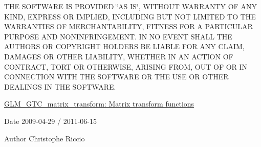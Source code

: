 \-T\-H\-E \-S\-O\-F\-T\-W\-A\-R\-E \-I\-S \-P\-R\-O\-V\-I\-D\-E\-D \char`\"{}\-A\-S I\-S\char`\"{}, \-W\-I\-T\-H\-O\-U\-T \-W\-A\-R\-R\-A\-N\-T\-Y \-O\-F \-A\-N\-Y \-K\-I\-N\-D, \-E\-X\-P\-R\-E\-S\-S \-O\-R \-I\-M\-P\-L\-I\-E\-D, \-I\-N\-C\-L\-U\-D\-I\-N\-G \-B\-U\-T \-N\-O\-T \-L\-I\-M\-I\-T\-E\-D \-T\-O \-T\-H\-E \-W\-A\-R\-R\-A\-N\-T\-I\-E\-S \-O\-F \-M\-E\-R\-C\-H\-A\-N\-T\-A\-B\-I\-L\-I\-T\-Y, \-F\-I\-T\-N\-E\-S\-S \-F\-O\-R \-A \-P\-A\-R\-T\-I\-C\-U\-L\-A\-R \-P\-U\-R\-P\-O\-S\-E \-A\-N\-D \-N\-O\-N\-I\-N\-F\-R\-I\-N\-G\-E\-M\-E\-N\-T. \-I\-N \-N\-O \-E\-V\-E\-N\-T \-S\-H\-A\-L\-L \-T\-H\-E \-A\-U\-T\-H\-O\-R\-S \-O\-R \-C\-O\-P\-Y\-R\-I\-G\-H\-T \-H\-O\-L\-D\-E\-R\-S \-B\-E \-L\-I\-A\-B\-L\-E \-F\-O\-R \-A\-N\-Y \-C\-L\-A\-I\-M, \-D\-A\-M\-A\-G\-E\-S \-O\-R \-O\-T\-H\-E\-R \-L\-I\-A\-B\-I\-L\-I\-T\-Y, \-W\-H\-E\-T\-H\-E\-R \-I\-N \-A\-N \-A\-C\-T\-I\-O\-N \-O\-F \-C\-O\-N\-T\-R\-A\-C\-T, \-T\-O\-R\-T \-O\-R \-O\-T\-H\-E\-R\-W\-I\-S\-E, \-A\-R\-I\-S\-I\-N\-G \-F\-R\-O\-M, \-O\-U\-T \-O\-F \-O\-R \-I\-N \-C\-O\-N\-N\-E\-C\-T\-I\-O\-N \-W\-I\-T\-H \-T\-H\-E \-S\-O\-F\-T\-W\-A\-R\-E \-O\-R \-T\-H\-E \-U\-S\-E \-O\-R \-O\-T\-H\-E\-R \-D\-E\-A\-L\-I\-N\-G\-S \-I\-N \-T\-H\-E \-S\-O\-F\-T\-W\-A\-R\-E.

\hyperlink{group__gtc__matrix__transform}{\-G\-L\-M\-\_\-\-G\-T\-C\-\_\-matrix\-\_\-transform\-: \-Matrix transform functions}

\begin{DoxyDate}{\-Date}
2009-\/04-\/29 / 2011-\/06-\/15 
\end{DoxyDate}
\begin{DoxyAuthor}{\-Author}
\-Christophe \-Riccio 
\end{DoxyAuthor}
